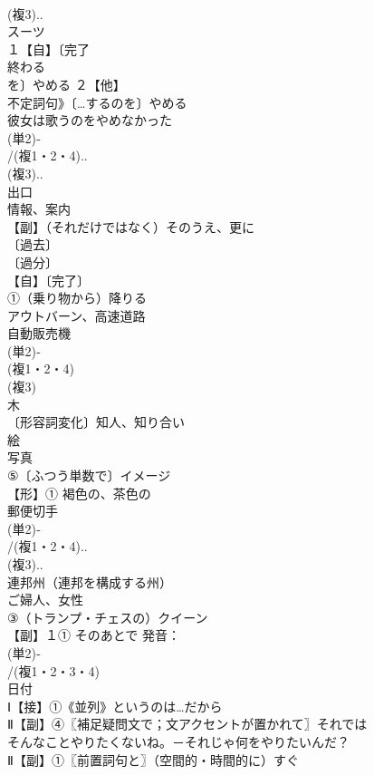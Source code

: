 \documentclass[8pt]{extreport}
\begin{document}
\begin{CJK}{UTF8}{min}
\\	(複3)..
\\	スーツ 
\\	１【自】〔完了
\\	終わる 
\\	を〕やめる ２【他】
\\	不定詞句》〔…するのを〕やめる　
\\	彼女は歌うのをやめなかった
\\	(単2)‐
\\	/(複1・2・4).. 
\\	(複3).. 
\\	出口 
\\	情報、案内 
\\	【副】（それだけではなく）そのうえ、更に 
\\	〔過去〕
\\	〔過分〕
\\	【自】〔完了〕
\\	①（乗り物から）降りる 
\\	アウトバーン、高速道路 
\\	自動販売機 
\\	(単2)‐
\\	(複1・2・4)
\\	(複3)
\\	木 
\\	〔形容詞変化〕知人、知り合い 
\\	絵 
\\	写真 
\\	⑤〔ふつう単数で〕イメージ
\\	【形】① 褐色の、茶色の 
\\	郵便切手 
\\	(単2)‐
\\	/(複1・2・4)..
\\	(複3)..
\\	連邦州（連邦を構成する州）
\\	ご婦人、女性 
\\	③（トランプ・チェスの）クイーン
\\	【副】１① そのあとで 発音：
\\	(単2)‐
\\	/(複1・2・3・4)
\\	日付 
\\	Ⅰ【接】①《並列》というのは…だから
\\	Ⅱ【副】④〖補足疑問文で；文アクセントが置かれて〗それでは 
\\	そんなことやりたくないね。－それじゃ何をやりたいんだ？
\\	Ⅱ【副】①〖前置詞句と〗（空間的・時間的に）すぐ 

\end{CJK}
\end{document}

